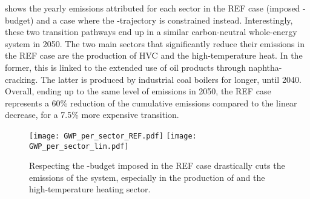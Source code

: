  shows the yearly emissions attributed for each sector in the REF case (\ie imposed -budget) and a case where the -trajectory is constrained instead. Interestingly, these two transition pathways end up in a similar carbon-neutral whole-energy system in 2050. The two main sectors that significantly reduce their emissions in the REF case are the production of \gls{HVC} and the high-temperature heat. In the former, this is linked to the extended use of oil products through naphtha-cracking. The latter is produced by industrial coal boilers for longer, until 2040. Overall, ending up to the same level of emissions in 2050, the REF case represents a 60\% reduction of the cumulative emissions compared to the linear decrease, for a 7.5\% more expensive transition.

\begin{figure}[htbp!]
\centering
\texttt{[image: GWP\_per\_sector\_REF.pdf]}
\texttt{[image: GWP\_per\_sector\_lin.pdf]}
\caption{Respecting the -budget imposed in the REF case drastically cuts the emissions of the system, especially in the production of  and the high-temperature heating sector.}
\label{fig:app_CO2_REF_lin}
\end{figure}